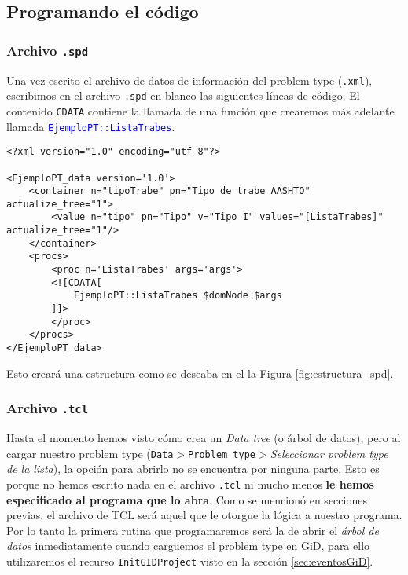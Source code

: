 \documentclass[10pt, a4paper, twocolumn]{article} %
\begin{document}
\subsection{Programando el código}

\subsubsection{Archivo \texttt{.spd}}

Una vez escrito el archivo de datos de información del problem type (\texttt{.xml}), escribimos en el archivo \texttt{.spd} en blanco las siguientes líneas de código. El contenido \texttt{CDATA} contiene la llamada de una función que crearemos más adelante llamada \textcolor{blue}{\texttt{EjemploPT::ListaTrabes}}.

\lstset{language=XML} 
\begin{lstlisting}
<?xml version="1.0" encoding="utf-8"?>

<EjemploPT_data version='1.0'>
	<container n="tipoTrabe" pn="Tipo de trabe AASHTO" actualize_tree="1">
		<value n="tipo" pn="Tipo" v="Tipo I" values="[ListaTrabes]" actualize_tree="1"/>
  	</container>
  	<procs>
    	<proc n='ListaTrabes' args='args'>
      	<![CDATA[
        	EjemploPT::ListaTrabes $domNode $args
      	]]>
    	</proc>
  	</procs>
</EjemploPT_data>
\end{lstlisting}

Esto creará una estructura como se deseaba en el la Figura \ref{fig:estructura_spd}.

\subsubsection{Archivo \texttt{.tcl}}

Hasta el momento hemos visto cómo crea un \textit{Data tree} (o árbol de datos), pero al cargar nuestro problem type (\texttt{Data$>$Problem type$>$}\textit{Seleccionar problem type de la lista}), la opción para abrirlo no se encuentra por ninguna parte. Esto es porque no hemos escrito nada en el archivo \texttt{.tcl} ni mucho menos \textbf{le hemos especificado al programa que lo abra}. Como se mencionó en secciones previas, el archivo de TCL será aquel que le otorgue la lógica a nuestro programa. Por lo tanto la primera rutina que programaremos será la de abrir el \textit{árbol de datos} inmediatamente cuando carguemos el problem type en GiD, para ello utilizaremos el recurso \texttt{InitGIDProject} visto en la sección \ref{sec:eventosGiD}.
\end{document}
